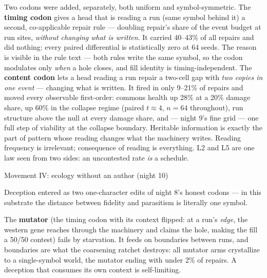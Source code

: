 Two codons were added, separately, both uniform and
symbol-symmetric. The {\bf timing codon} gives a head that is
reading a run (same symbol behind it) a second, co-applicable
repair rule --- doubling repair's share of the event budget at run
sites, {\it without changing what is written}. It carried 40--43\%
of all repairs and did nothing: every paired differential is
statistically zero at 64 seeds. The reason is visible in the rule
text --- both rules write the same symbol, so the codon modulates
only {\it when} a hole closes, and fill identity is
timing-independent. The {\bf content codon} lets a head reading a
run repair a two-cell gap with {\it two copies in one event} ---
changing what is written. It fired in only 9--21\% of repairs and
moved every observable first-order: commons health up 28\% at a
20\% damage share, up 60\% in the collapse regime (paired
$t\approx4$, $n{=}64$ throughout), run structure above the null at
every damage share, and --- night 9's fine grid --- one full step
of viability at the collapse boundary.  Heritable
information is exactly the part of pattern whose reading changes
what the machinery writes. Reading frequency is irrelevant;
consequence of reading is everything. L2 and L5 are one law seen
from two sides: an uncontested rate {\it is} a schedule.

\sec Movement IV: ecology without an author (night 10)

Deception entered as two one-character edits of night 8's honest
codons --- in this substrate the distance between fidelity and
parasitism is literally one symbol.

The {\bf mutator} (the timing codon with its context flipped: at a
run's {\it edge}, the western gene reaches through the machinery
and claims the hole, making the fill a 50/50 contest) fails by
starvation. It feeds on boundaries between runs, and boundaries
are what the coarsening ratchet destroys: all mutator arms
crystallize to a single-symbol world, the mutator ending with
under 2\% of repairs. A deception that consumes its own context is
self-limiting.


